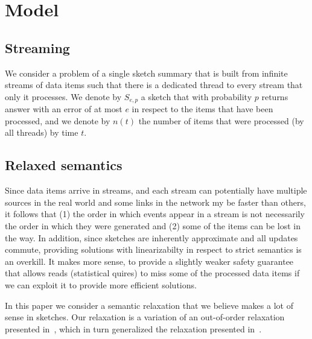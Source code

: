 \section{Model}
\label{sec:model}




\subsection{Streaming}


We consider a problem of a single sketch summary that is built
from infinite streams of data items such that there is a
dedicated thread to every stream that only it processes.
We denote by $S_{e,p}$ a sketch that with probability $p$
returns answer with an error of at most $e$ in respect to the
items that have been processed, and we denote by $n(t)$ the
number of items that were processed (by all threads) by time
$t$.

\subsection{Relaxed semantics}






Since data items arrive in streams, and each stream can
potentially have multiple sources in the real world and some
links in the network my be faster than others, it follows
that (1) the order in which events appear in a stream is not
necessarily the order in which they were generated and (2) some
of the items can be lost in the way.
In addition, since sketches are inherently approximate and all
updates commute, providing solutions with linearizabilty in
respect to strict semantics is an overkill.
It makes more sense, to provide a slightly weaker safety
guarantee that allows reads (statistical quires) to miss some of
the processed data items if we can exploit it to provide
more efficient solutions.

In this paper we consider a semantic relaxation that we believe
makes a lot of sense in sketches.
Our relaxation is a variation of an out-of-order relaxation
presented in~\cite{Henzinger}, which in turn generalized the
relaxation presented in~\cite{Afek}.

